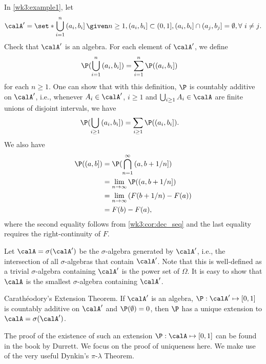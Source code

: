 \documentclass[../aipt.tex]{subfiles}
\begin{document}
In \cref{wk3:example1}, let 
\begin{align*}
\calA' = \set*{\bigcup\limits_{i=1}^{n} \left(a_i, b_i\right] \given n \geq 1, \left(a_i, b_i\right] \subset (0, 1], \left(a_i, b_i\right] \cap \left(a_j, b_j\right] = \emptyset, \forall\ i \neq j}. 
\end{align*}
Check that $\calA'$ is an algebra. For each element of $\calA'$, we define
\begin{align*}
\P(\bigcup\limits_{i=1}^{n} {(a_i, b_i]}) &= \sum_{i=1}^n \P({(a_i, b_i]})
\end{align*}
for each $n\geq1$. One can show that with this definition, $\P$ is countably additive on $\calA'$, i.e., whenever $A_i \in \calA'$, $i\geq 1$ and $\bigcup_{i\geq 1} A_i \in \calA$ are finite unions of disjoint intervals, we have
\begin{align*}
\P(\bigcup\limits_{i\geq 1} {(a_i, b_i]}) &= \sum_{i\geq 1} \P({(a_i, b_i]}).
\end{align*}
We also have
\begin{align*}
\P({(a, b]}) 
&= \P(\bigcap\limits_{n=1}^{\infty} {(a, b + 1/n ]}) \\
&= \lim_{n \to \infty} \P({(a, b + 1/n]}) \\
&= \lim_{n \to \infty} \left(F(b+1/n) - F(a) \right) \\
&= F(b) - F(a),
\end{align*}
where the second equality follows from \cref{wk3:cor:dec_seq} and the last equality requires the right-continuity of $F$. 

Let $\calA = \sigma(\calA')$ be the $\sigma$-algebra generated by $\calA'$, i.e., the intersection of all $\sigma$-algebras that contain $\calA'$. Note that this is well-defined as a trivial $\sigma$-algebra containing $\calA'$ is the power set of $\Omega$. It is easy to show that $\calA$ is the smallest $\sigma$-algebra containing $\calA'$.

\begin{Theorem}\label{Caratheodory Theorem}
Carath{\'e}odory's Extension Theorem. If $\calA'$ is an algebra, $\P : \calA' \mapsto [0, 1]$ is countably additive on $\calA'$ and $\P(\emptyset)=0$, then $\P$ has a unique extension to $\calA = \sigma(\calA')$.
\end{Theorem}
%

The proof of the existence of such an extension $\P: \calA \mapsto [0,1]$ can be found in the book by Durrett. We focus on the proof of uniqueness here. We make use of the very useful Dynkin's $\pi$-$\lambda$ Theorem.
\end{document}
